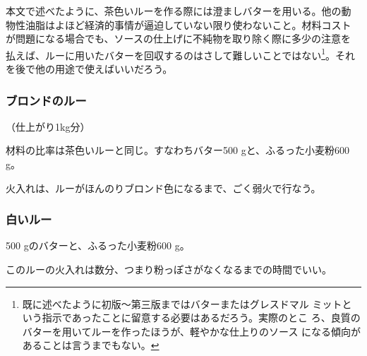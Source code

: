 \begin{recette}
本文で述べたように、茶色いルーを作る際には澄ましバターを用いる。他の動
物性油脂はよほど経済的事情が逼迫していない限り使わないこと。材料コスト
が問題になる場合でも、ソースの仕上げに不純物を取り除く際に多少の注意を
払えば、ルーに用いたバターを回収するのはさして難しいことではない\footnote{既に述べたように初版〜第三版まではバターまたはグレスドマル
  ミットという指示であったことに留意する必要はあるだろう。実際のとこ
  ろ、良質のバターを用いてルーを作ったほうが、軽やかな仕上りのソース
  になる傾向があることは言うまでもない。}。それ
を後で他の用途で使えばいいだろう。

\hypertarget{roux-blond}{%
\subsubsection{ブロンドのルー}\label{roux-blond}}



（仕上がり1kg分）

材料の比率は茶色いルーと同じ。すなわちバター500 gと、ふるった小麦粉600
g。

火入れは、ルーがほんのりブロンド色になるまで、ごく弱火で行なう。

\hypertarget{roux-blanc}{%
\subsubsection{白いルー}\label{roux-blanc}}


 

500 gのバターと、ふるった小麦粉600 g。

このルーの火入れは数分、つまり粉っぽさがなくなるまでの時間でいい。
\end{recette}